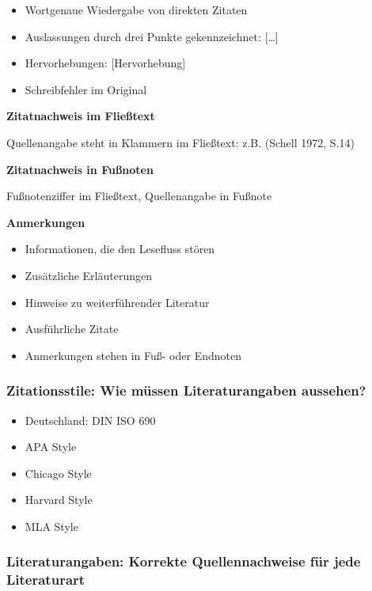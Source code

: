 \begin{itemize}%
\item
  Wortgenaue Wiedergabe von direkten Zitaten
\item
  Auslassungen durch drei Punkte gekennzeichnet: {[}\ldots{}{]}
\item
  Hervorhebungen: {[}Hervorhebung{]}
\item
  Schreibfehler im Original
\end{itemize}

\textbf{Zitatnachweis im Fließtext}

Quellenangabe steht in Klammern im Fließtext: z.B. (Schell 1972, S.14)

\textbf{Zitatnachweis in Fußnoten}

Fußnotenziffer im Fließtext, Quellenangabe in Fußnote

\textbf{Anmerkungen}

\begin{itemize}%
\item
  Informationen, die den Lesefluss stören
\item
  Zusätzliche Erläuterungen
\item
  Hinweise zu weiterführender Literatur
\item
  Ausführliche Zitate
\item
  Anmerkungen stehen in Fuß- oder Endnoten
\end{itemize}

\subsubsection{Zitationsstile: Wie müssen Literaturangaben
aussehen?}\label{zitationsstile-wie-muessen-literaturangaben-aussehen}

\begin{itemize}%
\item
  Deutschland: DIN ISO 690
\item
  APA Style
\item
  Chicago Style
\item
  Harvard Style
\item
  MLA Style
\end{itemize}

\subsubsection{Literaturangaben: Korrekte Quellennachweise für jede
Literaturart}\label{literaturangaben-korrekte-quellennachweise-fuer-jede-literaturart}

